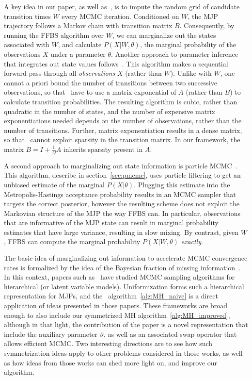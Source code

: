 A key idea in our paper, as well as~\cite{RaoTeh13}, is to impute the random grid of candidate transition times $W$ every MCMC iteration. 
Conditioned on $W$, the MJP trajectory follows a Markov chain with transition matrix $B$. 
Consequently, by running the FFBS algorithm over $W$, we can marginalize out the states associated with $W$, and calculate $P(X|W,\theta)$, the marginal probability of the observations $X$ under a parameter $\theta$. 
Another approach to parameter inference that integrates out state values follows~\citep{FearnSher2006}. 
 This algorithm makes a sequential forward pass through all {\em observations} $X$ (rather than $W$). 
 Unlike with $W$, one cannot a priori bound the number of transitions between two successive observations, so that~\citet{FearnSher2006} have to use a matrix exponential of $A$ (rather than $B$) to calculate transition probabilities.
 The resulting algorithm is cubic, rather than quadratic in the number of states, and the number of expensive matrix exponentiations needed depends on the number of observations, rather than the number of transitions.
 Further, matrix exponentiation results in a dense matrix, so that~\cite{FearnSher2006} cannot exploit sparsity in the transition matrix.
 In our framework, the matrix $B=I+\frac{1}{\Omega}A$ inherits sparsity present in $A$.

 A second approach to marginalizing out state information is particle MCMC~\citep{Andrieu10}. 
 This algorithm, describe in section~\ref{sec:pmcmc}, uses 
 particle filtering to get an unbiased estimate of the marginal 
 $P(X|\theta)$. 
 Plugging this estimate into the Metropolis-Hastings acceptance probability results in an MCMC sampler that targets the correct posterior, however the resulting scheme does not exploit the Markovian structure of the MJP the way FFBS can. 
 In particular, observations that are informative of the MJP state can result in marginal probability estimates that have large variance, resulting in slow mixing. 
 By contrast, given $W$, FFBS can compute the marginal probability $P(X|W,\theta)$ {\em exactly}. 

The basic idea of marginalizing out information to accelerate MCMC convergence rates is formalized by the idea of the Bayesian fraction of missing information~\citep{liu1994fraction}. 
In this context, papers such as~\citet{papaspiliopoulos2007general,yu2011center} have studied MCMC sampling algorithms for hierarchical (or latent variable models). 
Uniformization forms such a hierarchical representation for MJPs, and the \naive\ algorithm~\ref{alg:MH_naive} is a direct application of ideas presented in those papers.
These frameworks are broad enough to also include our symmetrized MH algorithm~\ref{alg:MH_improved}, although in that light, the contribution of the paper is a novel representation that include the auxiliary parameter $\vartheta$, as well as an associated swap operator that allows efficient MCMC.
Two interesting directions are to see how such symmetrization ideas apply to other problems considered in those works, as well as how ideas from those works can shed more light on, and improve our algorithm.

